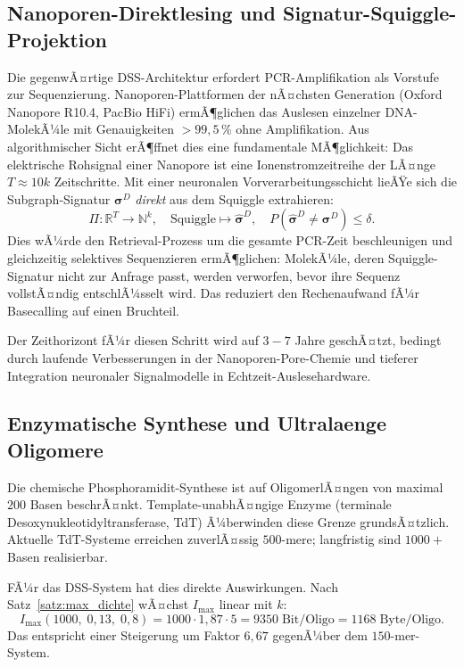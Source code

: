 ﻿\documentclass[a4paper,12pt]{article}
\theoremstyle{definition}
\theoremstyle{plain}
\begin{document}
\subsection{Nanoporen-Direktlesing und Signatur-Squiggle-Projektion}
\label{ssec:nanopore}

Die gegenwÃ¤rtige DSS-Architektur erfordert PCR-Amplifikation als
Vorstufe zur Sequenzierung.  Nanoporen-Plattformen der nÃ¤chsten Generation
(Oxford Nanopore R10.4, PacBio HiFi) ermÃ¶glichen das Auslesen einzelner
DNA-MolekÃ¼le mit Genauigkeiten $> 99{,}5\,\%$ ohne Amplifikation.
Aus algorithmischer Sicht erÃ¶ffnet dies eine fundamentale MÃ¶glichkeit:
Das elektrische Rohsignal einer Nanopore ist eine Ionenstromzeitreihe der
LÃ¤nge $T \approx 10k$ Zeitschritte.  Mit einer neuronalen Vorverarbeitungsschicht
lieÃŸe sich die Subgraph-Signatur $\boldsymbol{\sigma}^D$ \emph{direkt} aus
dem Squiggle extrahieren:
\[
  \Pi: \mathbb{R}^T \to \mathbb{N}^k,
  \quad \text{Squiggle} \mapsto \hat{\boldsymbol{\sigma}}^D,
  \quad P(\hat{\boldsymbol{\sigma}}^D \neq \boldsymbol{\sigma}^D) \le \delta.
\]
Dies wÃ¼rde den Retrieval-Prozess um die gesamte PCR-Zeit beschleunigen und
gleichzeitig selektives Sequenzieren ermÃ¶glichen: MolekÃ¼le, deren
Squiggle-Signatur nicht zur Anfrage passt, werden verworfen, bevor ihre
Sequenz vollstÃ¤ndig entschlÃ¼sselt wird.  Das reduziert den Rechenaufwand
fÃ¼r Basecalling auf einen Bruchteil.

Der Zeithorizont fÃ¼r diesen Schritt wird auf $3{-}7$ Jahre geschÃ¤tzt,
bedingt durch laufende Verbesserungen in der Nanoporen-Pore-Chemie und
tieferer Integration neuronaler Signalmodelle in Echtzeit-Auslesehardware.

\subsection{Enzymatische Synthese und Ultralaenge Oligomere}
\label{ssec:enzymatisch}

Die chemische Phosphoramidit-Synthese ist auf OligomerlÃ¤ngen von maximal
$200$ Basen beschrÃ¤nkt.  Template-unabhÃ¤ngige Enzyme (terminale
Desoxynukleotidyltransferase, TdT) Ã¼berwinden diese Grenze grundsÃ¤tzlich.
Aktuelle TdT-Systeme erreichen zuverlÃ¤ssig $500$-mere; langfristig sind
$1000+$ Basen realisierbar.

FÃ¼r das DSS-System hat dies direkte Auswirkungen.  Nach
Satz~\ref{satz:max_dichte} wÃ¤chst $I_{\max}$ linear mit $k$:
\[
  I_{\max}(1000,\; 0{,}13,\; 0{,}8) = 1000 \cdot 1{,}87 \cdot 5
  = 9350\;\text{Bit/Oligo} = 1168\;\text{Byte/Oligo}.
\]
Das entspricht einer Steigerung um Faktor $6{,}67$ gegenÃ¼ber dem
$150$-mer-System.
\end{document}
